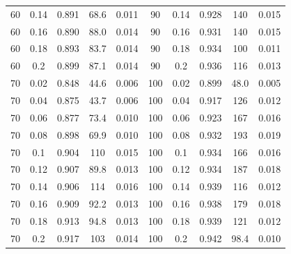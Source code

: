 \documentclass[12pt]{article}
\begin{document}
\begin{spacing}{2.0}
\begin{table}[hb!]
\begin{tabular}{c c | c | c c ||c c | c | c c |}
                60&0.14&0.891&68.6&0.011	&	90&0.14&0.928&140&0.015\\
                60&0.16&0.890&88.0&0.014	&	90&0.16&0.931&140&0.015\\
                60&0.18&0.893&83.7&0.014	&	90&0.18&0.934&100&0.011\\
                60&0.2&0.899&87.1&0.014	&	90&0.2&0.936&116&0.013\\
                70&0.02&0.848&44.6&0.006	&	100&0.02&0.899&48.0&0.005\\
                70&0.04&0.875&43.7&0.006	&	100&0.04&0.917&126&0.012\\
                70&0.06&0.877&73.4&0.010	&	100&0.06&0.923&167&0.016\\
                70&0.08&0.898&69.9&0.010	&	100&0.08&0.932&193&0.019\\
                70&0.1&0.904&110&0.015	&	100&0.1&0.934&166&0.016\\
                70&0.12&0.907&89.8&0.013	&	100&0.12&0.934&187&0.018\\
                70&0.14&0.906&114&0.016	&	100&0.14&0.939&116&0.012\\
                70&0.16&0.909&92.2&0.013	&	100&0.16&0.938&179&0.018\\
                70&0.18&0.913&94.8&0.013	&	100&0.18&0.939&121&0.012\\
                70&0.2&0.917&103&0.014	&	100&0.2&0.942&98.4&0.010\\
				\hline
			\end{tabular}
			\end{table}


\end{spacing}
\end{document}
